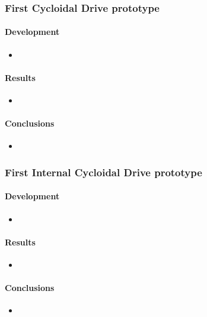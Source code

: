 \documentclass{article}
\begin{document}
\subsubsection{First Cycloidal Drive prototype}
\paragraph[short]{Development}
\begin{itemize}
    \item 
\end{itemize}
\paragraph[short]{Results}
\begin{itemize}
    \item 
\end{itemize}

\paragraph[short]{Conclusions}
\begin{itemize}
    \item 
\end{itemize}

\subsubsection{First \textbf{Internal} Cycloidal Drive prototype}
\paragraph[short]{Development}
\begin{itemize}
    \item 
\end{itemize}
\paragraph[short]{Results}
\begin{itemize}
    \item 
\end{itemize}

\paragraph[short]{Conclusions}
\begin{itemize}
    \item 
\end{itemize}
\end{document}
